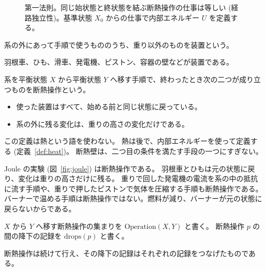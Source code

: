 \begin{figure}[htbp]
  \centering
  \caption{第一法則。同じ始状態と終状態を結ぶ断熱操作の仕事は等しい (経路独立性)。基準状態 $X_0$ からの仕事で内部エネルギー $U$ を定義する。}
  \label{fig:firstlaw}
\end{figure}

\begin{definition}[装置]
  \label{def:apparatus}
  系の外にあって手順で使うもののうち、重り以外のものを装置という。
\end{definition}

羽根車、ひも、滑車、発電機、ピストン、容器の壁などが装置である。

\begin{definition}[断熱操作]
  \label{def:adiabatic-op}
  系を平衡状態 $X$ から平衡状態 $Y$ へ移す手順で、終わったとき次の二つが成り立つものを断熱操作という。
  \begin{itemize}
    \item 使った装置はすべて、始める前と同じ状態に戻っている。
    \item 系の外に残る変化は、重りの高さの変化だけである。
  \end{itemize}
\end{definition}

この定義は熱という語を使わない。
熱は後で、内部エネルギーを使って定義する (定義~\ref{def:heat})。
断熱壁は、二つ目の条件を満たす手段の一つにすぎない。

Joule の実験 (図~\ref{fig:joule}) は断熱操作である。
羽根車とひもは元の状態に戻り、変化は重りの高さだけに残る。
重りで回した発電機の電流を系の中の抵抗に流す手順や、重りで押したピストンで気体を圧縮する手順も断熱操作である。
バーナーで温める手順は断熱操作ではない。燃料が減り、バーナーが元の状態に戻らないからである。

\begin{definition}[断熱操作の集まり]
  \label{def:ops}
  \leanok
  $X$ から $Y$ へ移す断熱操作の集まりを $\mathrm{Operation}(X, Y)$ と書く。
  断熱操作 $p$ の間の降下の記録を $\mathrm{drops}(p)$ と書く。
\end{definition}

\begin{empirical}[断熱操作は続けて行える]
  \label{emp:ops-seq}
  \leanok
  断熱操作は続けて行え、その降下の記録はそれぞれの記録をつなげたものである。
\end{empirical}

